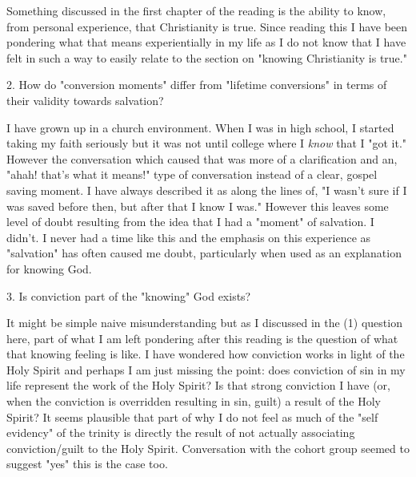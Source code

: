 \documentclass[12pt]{turabian-researchpaper}
\begin{document}
Something discussed in the first chapter of the reading is the ability to know, from personal experience, that Christianity is true. Since reading this I have been pondering what that means experientially in my life as I do not know that I have felt in such a way to easily relate to the section on "knowing Christianity is true." 

2. How do "conversion moments" differ from "lifetime conversions" in terms of their validity towards salvation?

I have grown up in a church environment. When I was in high school, I started taking my faith seriously but it was not until college where I \textit{know} that I "got it." However the conversation which caused that was more of a clarification and an, "ahah! that's what it means!" type of conversation instead of a clear, gospel saving moment. I have always described it as along the lines of, "I wasn't sure if I was saved before then, but after that I know I was." However this leaves some level of doubt resulting from the idea that I had a "moment" of salvation. I didn't. I never had a time like this and the emphasis on this experience as "salvation" has often caused me doubt, particularly when used as an explanation for knowing God.

3. Is conviction part of the "knowing" God exists?

It might be simple naive misunderstanding but as I discussed in the (1) question here, part of what I am left pondering after this reading is the question of what that knowing feeling is like. I have wondered how conviction works in light of the Holy Spirit and perhaps I am just missing the point: does conviction of sin in my life represent the work of the Holy Spirit? Is that strong conviction I have (or, when the conviction is overridden resulting in sin, guilt) a result of the Holy Spirit? It seems plausible that part of why I do not feel as much of the "self evidency" of the trinity is directly the result of not actually associating conviction/guilt to the Holy Spirit. Conversation with the cohort group seemed to suggest "yes" this is the case too.
\newpage
\printbibliography
\end{document}
